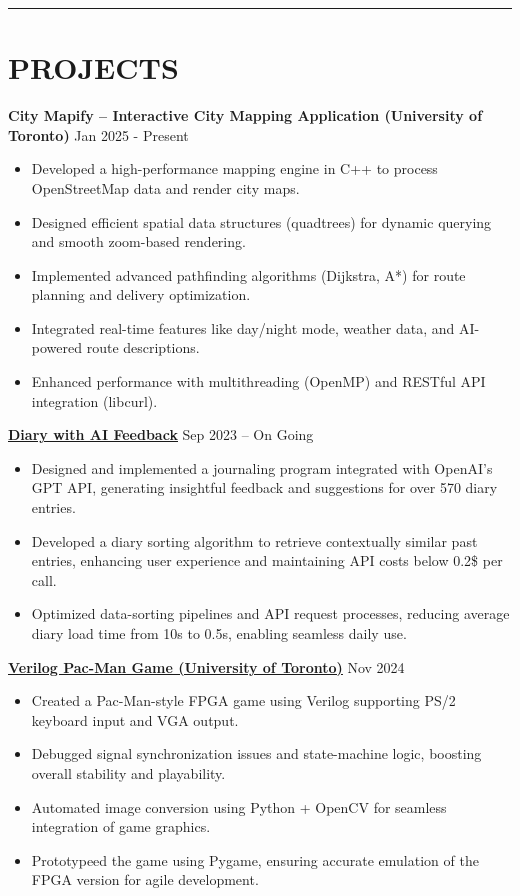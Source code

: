 \documentclass[a4paper,10pt]{article}
\begin{document}
\noindent\rule{\linewidth}{1pt}

\section*{\textbf{PROJECTS}}

\noindent
\textbf{City Mapify – Interactive City Mapping Application (University of Toronto)} \hfill Jan 2025 - Present
\begin{itemize}[leftmargin=0.2in]
    \item Developed a high-performance mapping engine in C++ to process OpenStreetMap data and render city maps.
    \item Designed efficient spatial data structures (quadtrees) for dynamic querying and smooth zoom-based rendering.
    \item Implemented advanced pathfinding algorithms (Dijkstra, A*) for route planning and delivery optimization.
    \item Integrated real-time features like day/night mode, weather data, and AI-powered route descriptions.
    \item Enhanced performance with multithreading (OpenMP) and RESTful API integration (libcurl).
\end{itemize}


\noindent\href{https://github.com/Ken-2511/Diary-with-ChatGPT-Comment}{\uline{
\textbf{Diary with AI Feedback}}} \hfill Sep 2023 -- On Going
\begin{itemize}[leftmargin=0.2in]
    \item Designed and implemented a journaling program integrated with OpenAI’s GPT API, generating insightful feedback and suggestions for over 570 diary entries.
    \item Developed a diary sorting algorithm to retrieve contextually similar past entries, enhancing user experience and maintaining API costs below 0.2\$ per call.
    \item Optimized data-sorting pipelines and API request processes, reducing average diary load time from 10s to 0.5s, enabling seamless daily use.
\end{itemize}


\vspace{0.3cm}
\noindent\href{https://github.com/Ken-2511/ECE241-Project}{\uline{
\textbf{Verilog Pac-Man Game (University of Toronto)}}} \hfill Nov 2024
\begin{itemize}[leftmargin=0.2in]
    \item Created a Pac-Man-style FPGA game using Verilog supporting PS/2 keyboard input and VGA output.
    \item Debugged signal synchronization issues and state-machine logic, boosting overall stability and playability.
    \item Automated image conversion using Python + OpenCV for seamless integration of game graphics.
    \item Prototypeed the game using Pygame, ensuring accurate emulation of the FPGA version for agile development.
\end{itemize}
\end{document}
